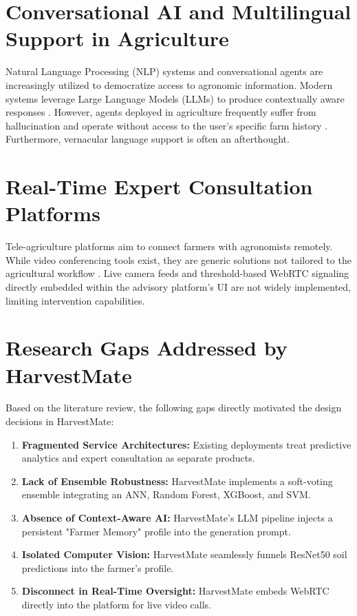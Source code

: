\documentclass[12pt,a4paper]{report}
\begin{document}
\section{Conversational AI and Multilingual Support in Agriculture}
Natural Language Processing (NLP) systems and conversational agents are increasingly utilized to democratize access to agronomic information. Modern systems leverage Large Language Models (LLMs) to produce contextually aware responses \cite{11}. However, agents deployed in agriculture frequently suffer from hallucination and operate without access to the user's specific farm history \cite{13}. Furthermore, vernacular language support is often an afterthought.

\section{Real-Time Expert Consultation Platforms}
Tele-agriculture platforms aim to connect farmers with agronomists remotely. While video conferencing tools exist, they are generic solutions not tailored to the agricultural workflow \cite{3}. Live camera feeds and threshold-based WebRTC signaling directly embedded within the advisory platform's UI are not widely implemented, limiting intervention capabilities.

\section{Research Gaps Addressed by HarvestMate}
Based on the literature review, the following gaps directly motivated the design decisions in HarvestMate:
\begin{enumerate}
    \item \textbf{Fragmented Service Architectures:} Existing deployments treat predictive analytics and expert consultation as separate products.
    \item \textbf{Lack of Ensemble Robustness:} HarvestMate implements a soft-voting ensemble integrating an ANN, Random Forest, XGBoost, and SVM.
    \item \textbf{Absence of Context-Aware AI:} HarvestMate's LLM pipeline injects a persistent "Farmer Memory" profile into the generation prompt.
    \item \textbf{Isolated Computer Vision:} HarvestMate seamlessly funnels ResNet50 soil predictions into the farmer's profile.
    \item \textbf{Disconnect in Real-Time Oversight:} HarvestMate embeds WebRTC directly into the platform for live video calls.
\end{enumerate}
\end{document}
